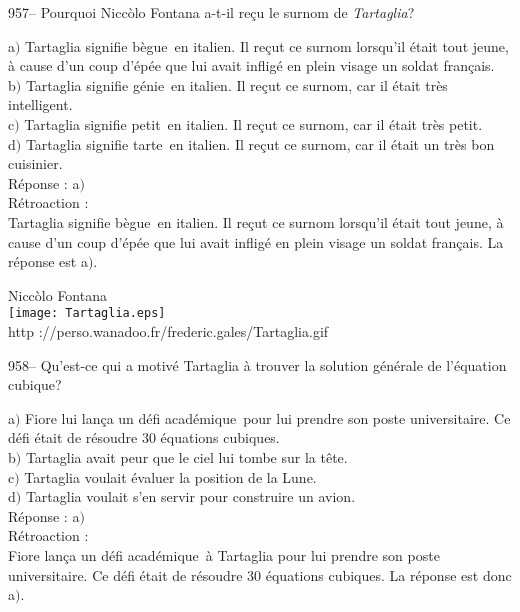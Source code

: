 ﻿\documentclass[letterpaper, 12pt]{article}
\begin{document}
957-- Pourquoi Nicc\`olo Fontana a-t-il re\c cu le surnom de {\sl
Tartaglia}?

a$)$ Tartaglia signifie \og b\`egue\fg\ en italien. Il re\c cut ce
surnom lorsqu'il \'etait tout jeune, \`a cause d'un coup d'\'ep\'ee
que lui avait inflig\'e en plein visage un
soldat fran\c cais. \\
b$)$ Tartaglia signifie \og g\'enie\fg\ en italien. Il re\c cut ce
surnom, car il
\'etait tr\`es intelligent.  \\
c$)$ Tartaglia signifie \og petit\fg\ en italien. Il re\c cut ce
surnom, car il \'etait tr\`es petit.  \\
d$)$ Tartaglia signifie \og tarte\fg\ en italien. Il re\c cut ce
surnom, car il \'etait un tr\`es bon cuisinier.\\

R\'eponse : a$)$\\

R\'etroaction :\\
Tartaglia signifie \og b\`egue\fg\ en italien. Il re\c cut ce surnom
lorsqu'il \'etait tout jeune, \`a cause d'un coup d'\'ep\'ee  que
lui avait inflig\'e en plein visage un
soldat fran\c cais. La r\'eponse est a$)$.\\

        \begin{center}
        Nicc\`olo Fontana\\
    \texttt{[image: Tartaglia.eps]}\\
        {\footnotesize http
://perso.wanadoo.fr/frederic.gales/Tartaglia.gif}
    \end{center}

958-- Qu'est-ce qui a motiv\'e Tartaglia \`a trouver la solution
g\'en\'erale de l'\'equation cubique?

a$)$ Fiore lui lan\c ca un \og d\'efi acad\'emique\fg\ pour lui
prendre son poste universitaire. Ce d\'efi \'etait
de r\'esoudre 30 \'equations cubiques. \\
b$)$ Tartaglia avait peur que le ciel lui tombe sur la t\^ete.   \\
c$)$ Tartaglia voulait \'evaluer la position de la Lune.   \\
d$)$ Tartaglia voulait s'en servir pour construire un avion. \\

R\'eponse : a$)$\\

R\'etroaction : \\
Fiore lan\c ca un \og d\'efi acad\'emique\fg\ \`a Tartaglia pour lui
prendre son poste universitaire. Ce d\'efi \'etait
de r\'esoudre 30 \'equations cubiques. La r\'eponse est donc a$)$.\\
\end{document}
